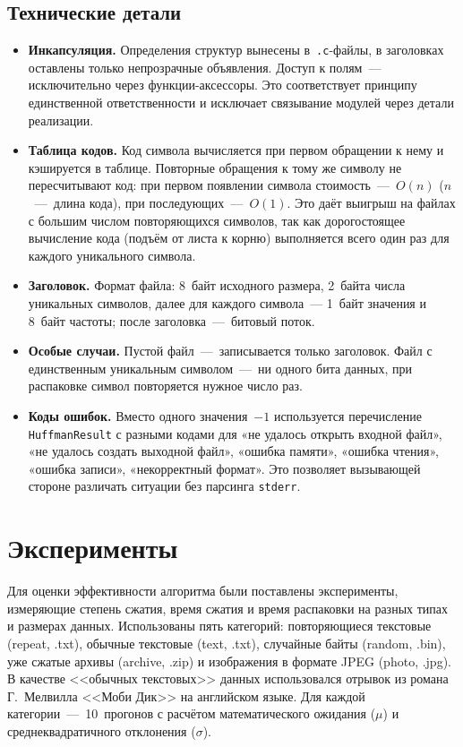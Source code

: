 \documentclass[a4paper]{article}
\begin{document}
\subsection{Технические детали}

\begin{itemize}
    \item \textbf{Инкапсуляция.} Определения структур вынесены в~\texttt{.c}-файлы,
    в заголовках оставлены только непрозрачные объявления.
    Доступ к полям~--- исключительно через функции-аксессоры.
    Это соответствует принципу единственной ответственности
    и исключает связывание модулей через детали реализации.

    \item \textbf{Таблица кодов.} Код символа вычисляется
    при первом обращении к нему и кэшируется в таблице. Повторные
    обращения к тому же символу не пересчитывают код: при первом
    появлении символа стоимость~---~$O(n)$ ($n$~---~длина кода),
    при последующих~---~$O(1)$. Это даёт выигрыш на файлах
    с большим числом повторяющихся символов, так как дорогостоящее вычисление кода (подъём от листа к корню) выполняется всего один раз для каждого уникального символа.

    \item \textbf{Заголовок.} Формат файла: 8~байт исходного размера,
    2~байта числа уникальных символов, далее для каждого символа~---
    1~байт значения и 8~байт частоты; после заголовка~---~битовый
    поток.

    \item \textbf{Особые случаи.} Пустой файл~---~записывается только
    заголовок. Файл с единственным уникальным символом~---~ни одного
    бита данных, при распаковке символ повторяется нужное число раз.

    \item \textbf{Коды ошибок.} Вместо одного значения~$-1$ используется
    перечисление \texttt{HuffmanResult} с разными кодами для
    «не удалось открыть входной файл», «не удалось создать выходной
    файл», «ошибка памяти», «ошибка чтения», «ошибка записи»,
    «некорректный формат». Это позволяет вызывающей стороне
    различать ситуации без парсинга \texttt{stderr}.
\end{itemize}

\section{Эксперименты}

Для оценки эффективности алгоритма были поставлены эксперименты,
измеряющие степень сжатия, время сжатия и время распаковки
на разных типах и размерах данных. Использованы пять категорий:
повторяющиеся текстовые (repeat, .txt), обычные текстовые (text, .txt),
случайные байты (random, .bin), уже сжатые архивы (archive, .zip)
и изображения в формате JPEG (photo, .jpg). В качестве <<обычных текстовых>> данных использовался отрывок из романа Г.~Мелвилла <<Моби Дик>> на английском языке. 
Для каждой категории~---~10~прогонов с расчётом математического
ожидания ($\mu$) и среднеквадратичного отклонения ($\sigma$).
\end{document}
